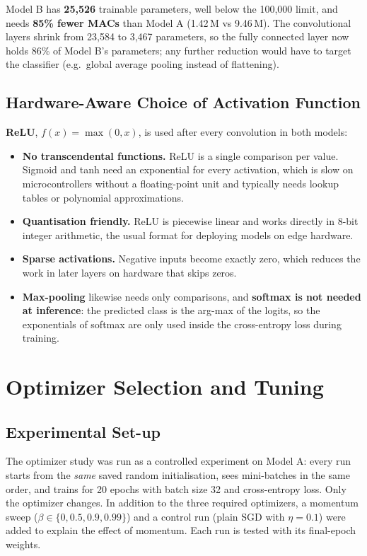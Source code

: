\documentclass[11pt, a4paper]{article}
\begin{document}
Model B has \textbf{25,526} trainable parameters, well below the 100,000 limit, and needs \textbf{85\% fewer MACs}
than Model A (1.42\,M vs 9.46\,M). The convolutional layers shrink from 23,584 to 3,467 parameters, so the fully
connected layer now holds 86\% of Model B's parameters; any further reduction would have to target the classifier
(e.g.\ global average pooling instead of flattening).

\subsection{Hardware-Aware Choice of Activation Function}

\textbf{ReLU}, $f(x) = \max(0, x)$, is used after every convolution in both models:
\begin{itemize}
    \item \textbf{No transcendental functions.} ReLU is a single comparison per value. Sigmoid and tanh need an
          exponential for every activation, which is slow on microcontrollers without a floating-point unit and
          typically needs lookup tables or polynomial approximations.
    \item \textbf{Quantisation friendly.} ReLU is piecewise linear and works directly in 8-bit integer arithmetic,
          the usual format for deploying models on edge hardware.
    \item \textbf{Sparse activations.} Negative inputs become exactly zero, which reduces the work in later layers on
          hardware that skips zeros.
    \item \textbf{Max-pooling} likewise needs only comparisons, and \textbf{softmax is not needed at inference}: the
          predicted class is the arg-max of the logits, so the exponentials of softmax are only used inside the
          cross-entropy loss during training.
\end{itemize}

\section{Optimizer Selection and Tuning}

\subsection{Experimental Set-up}

The optimizer study was run as a controlled experiment on Model A: every run starts from the \emph{same} saved random
initialisation, sees mini-batches in the same order, and trains for 20 epochs with batch size 32 and cross-entropy
loss. Only the optimizer changes. In addition to the three required optimizers, a momentum sweep
($\beta \in \{0, 0.5, 0.9, 0.99\}$) and a control run (plain SGD with $\eta = 0.1$) were added to explain the effect of
momentum. Each run is tested with its final-epoch weights.
\end{document}
